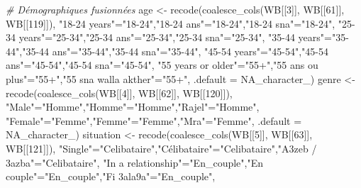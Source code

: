 \documentclass[
]{article}
\newenvironment{Shaded}{\begin{snugshade}}{\end{snugshade}}
\newcommand{\AttributeTok}[1]{\textcolor[rgb]{0.77,0.63,0.00}{#1}}
\newcommand{\CommentTok}[1]{\textcolor[rgb]{0.56,0.35,0.01}{\textit{#1}}}
\newcommand{\ConstantTok}[1]{\textcolor[rgb]{0.00,0.00,0.00}{#1}}
\newcommand{\DecValTok}[1]{\textcolor[rgb]{0.00,0.00,0.81}{#1}}
\newcommand{\FunctionTok}[1]{\textcolor[rgb]{0.00,0.00,0.00}{#1}}
\newcommand{\NormalTok}[1]{#1}
\newcommand{\OtherTok}[1]{\textcolor[rgb]{0.56,0.35,0.01}{#1}}
\newcommand{\StringTok}[1]{\textcolor[rgb]{0.31,0.60,0.02}{#1}}
\begin{document}
\begin{Shaded}
\begin{Highlighting}[]
\CommentTok{\# Démographiques fusionnées}
\NormalTok{age }\OtherTok{\textless{}{-}} \FunctionTok{recode}\NormalTok{(}\FunctionTok{coalesce\_cols}\NormalTok{(WB[[}\DecValTok{3}\NormalTok{]], WB[[}\DecValTok{61}\NormalTok{]], WB[[}\DecValTok{119}\NormalTok{]]),}
  \StringTok{"18{-}24 years"}\OtherTok{=}\StringTok{"18{-}24"}\NormalTok{,}\StringTok{"18{-}24 ans"}\OtherTok{=}\StringTok{"18{-}24"}\NormalTok{,}\StringTok{"18{-}24 sna"}\OtherTok{=}\StringTok{"18{-}24"}\NormalTok{,}
  \StringTok{"25{-}34 years"}\OtherTok{=}\StringTok{"25{-}34"}\NormalTok{,}\StringTok{"25{-}34 ans"}\OtherTok{=}\StringTok{"25{-}34"}\NormalTok{,}\StringTok{"25{-}34 sna"}\OtherTok{=}\StringTok{"25{-}34"}\NormalTok{,}
  \StringTok{"35{-}44 years"}\OtherTok{=}\StringTok{"35{-}44"}\NormalTok{,}\StringTok{"35{-}44 ans"}\OtherTok{=}\StringTok{"35{-}44"}\NormalTok{,}\StringTok{"35{-}44 sna"}\OtherTok{=}\StringTok{"35{-}44"}\NormalTok{,}
  \StringTok{"45{-}54 years"}\OtherTok{=}\StringTok{"45{-}54"}\NormalTok{,}\StringTok{"45{-}54 ans"}\OtherTok{=}\StringTok{"45{-}54"}\NormalTok{,}\StringTok{"45{-}54 sna"}\OtherTok{=}\StringTok{"45{-}54"}\NormalTok{,}
  \StringTok{"55 years or older"}\OtherTok{=}\StringTok{"55+"}\NormalTok{,}\StringTok{"55 ans ou plus"}\OtherTok{=}\StringTok{"55+"}\NormalTok{,}\StringTok{"55 sna walla akther"}\OtherTok{=}\StringTok{"55+"}\NormalTok{,}
  \AttributeTok{.default =} \ConstantTok{NA\_character\_}\NormalTok{)}
\NormalTok{genre }\OtherTok{\textless{}{-}} \FunctionTok{recode}\NormalTok{(}\FunctionTok{coalesce\_cols}\NormalTok{(WB[[}\DecValTok{4}\NormalTok{]], WB[[}\DecValTok{62}\NormalTok{]], WB[[}\DecValTok{120}\NormalTok{]]),}
  \StringTok{"Male"}\OtherTok{=}\StringTok{"Homme"}\NormalTok{,}\StringTok{"Homme"}\OtherTok{=}\StringTok{"Homme"}\NormalTok{,}\StringTok{"Rajel"}\OtherTok{=}\StringTok{"Homme"}\NormalTok{,}
  \StringTok{"Female"}\OtherTok{=}\StringTok{"Femme"}\NormalTok{,}\StringTok{"Femme"}\OtherTok{=}\StringTok{"Femme"}\NormalTok{,}\StringTok{"Mra"}\OtherTok{=}\StringTok{"Femme"}\NormalTok{, }\AttributeTok{.default =} \ConstantTok{NA\_character\_}\NormalTok{)}
\NormalTok{situation }\OtherTok{\textless{}{-}} \FunctionTok{recode}\NormalTok{(}\FunctionTok{coalesce\_cols}\NormalTok{(WB[[}\DecValTok{5}\NormalTok{]], WB[[}\DecValTok{63}\NormalTok{]], WB[[}\DecValTok{121}\NormalTok{]]),}
  \StringTok{"Single"}\OtherTok{=}\StringTok{"Celibataire"}\NormalTok{,}\StringTok{"Célibataire"}\OtherTok{=}\StringTok{"Celibataire"}\NormalTok{,}\StringTok{"A3zeb / 3azba"}\OtherTok{=}\StringTok{"Celibataire"}\NormalTok{,}
  \StringTok{"In a relationship"}\OtherTok{=}\StringTok{"En\_couple"}\NormalTok{,}\StringTok{"En couple"}\OtherTok{=}\StringTok{"En\_couple"}\NormalTok{,}\StringTok{"Fi 3ala9a"}\OtherTok{=}\StringTok{"En\_couple"}\NormalTok{,}

\end{Highlighting}
\end{Shaded}
\end{document}
